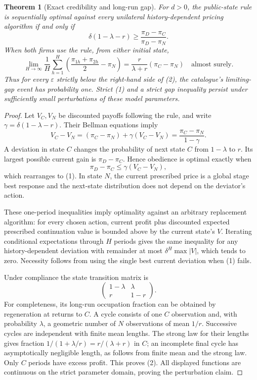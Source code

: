 \documentclass[11pt,a4paper]{article}
\newtheorem{theorem}{Theorem}[section]
\theoremstyle{remark}
\begin{document}
\begin{theorem}[Exact credibility and long-run gap]
For $d>0$, the public-state rule is sequentially optimal against every unilateral history-dependent pricing algorithm if and only if
\[
 \delta(1-\lambda-r)\ge
 \frac{\pi_D-\pi_C}{\pi_D-\pi_N}.
 \tag{1}
\]
When both firms use the rule, from either initial state,
\[
 \lim_{H\to\infty}\frac1H\sum_{h=1}^H
 \left(\frac{\pi_{1h}+\pi_{2h}}2-\pi_N\right)
 =\frac{r}{\lambda+r}(\pi_C-\pi_N)
 \quad\text{almost surely}. \tag{2}
\]
Thus for every $\varepsilon$ strictly below the right-hand side of (2), the catalogue's limiting-gap event has probability one. Strict (1) and a strict gap inequality persist under sufficiently small perturbations of these model parameters.
\end{theorem}
\begin{proof}
Let $V_C,V_N$ be discounted payoffs following the rule, and write $\gamma=\delta(1-\lambda-r)$. Their Bellman equations imply
\[
 V_C-V_N=(\pi_C-\pi_N)+\gamma(V_C-V_N)
 =\frac{\pi_C-\pi_N}{1-\gamma}.
\]
A deviation in state $C$ changes the probability of next state $C$ from $1-\lambda$ to $r$. Its largest possible current gain is $\pi_D-\pi_C$. Hence obedience is optimal exactly when
\[
 \pi_D-\pi_C\le\gamma(V_C-V_N),
\]
which rearranges to (1). In state $N$, the current prescribed price is a global stage best response and the next-state distribution does not depend on the deviator's action.

These one-period inequalities imply optimality against an arbitrary replacement algorithm: for every chosen action, current profit plus discounted expected prescribed continuation value is bounded above by the current state's $V$. Iterating conditional expectations through $H$ periods gives the same inequality for any history-dependent deviation with remainder at most $\delta^H\max|V|$, which tends to zero. Necessity follows from using the single best current deviation when (1) fails.

Under compliance the state transition matrix is
\[
 \begin{pmatrix}1-\lambda&\lambda\\r&1-r\end{pmatrix}.
\]
For completeness, its long-run occupation fraction can be obtained by regeneration at returns to $C$. A cycle consists of one $C$ observation and, with probability $\lambda$, a geometric number of $N$ observations of mean $1/r$. Successive cycles are independent with finite mean lengths. The strong law for their lengths gives fraction $1/(1+\lambda/r)=r/(\lambda+r)$ in $C$; an incomplete final cycle has asymptotically negligible length, as follows from finite mean and the strong law. Only $C$ periods have excess profit. This proves (2). All displayed functions are continuous on the strict parameter domain, proving the perturbation claim.
\end{proof}
\end{document}
